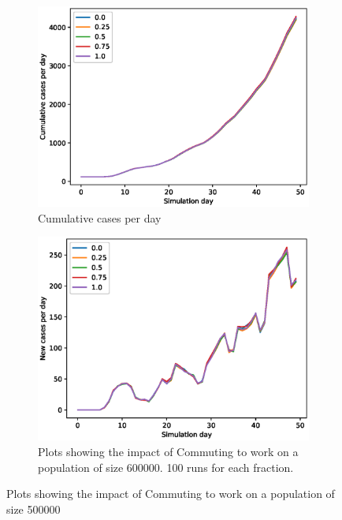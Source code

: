 \documentclass[runningheads]{llncs}
\begin{document}
\begin{figure}[h!]
	\centering
	\begin{subfigure}[b]{0.7\linewidth}
		\includegraphics[width=\textwidth]{work_cum_2.eps}
		\caption{Cumulative cases per day} 
	\end{subfigure}
	\begin{subfigure}[b]{0.7\linewidth}
		\includegraphics[width=\textwidth]{work_cases_per_day_2.eps}
		\caption{Plots showing the impact of Commuting to work on a population of size 600000. 100 runs for each fraction. } 
	\end{subfigure}
	\caption{Plots showing the impact of Commuting to work on a population of size 500000}
	\label{CommutingPlot3}
\end{figure}
\end{document}
